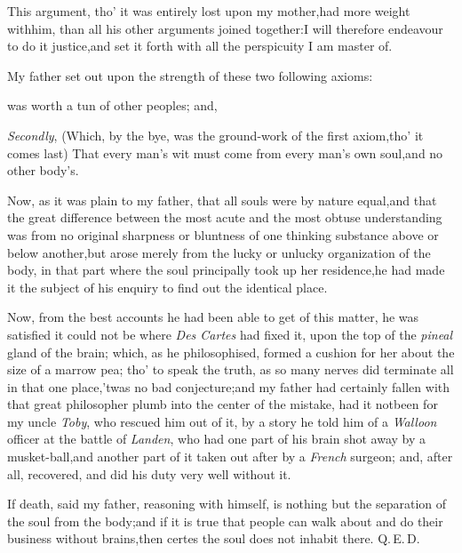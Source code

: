 \documentclass{article}
\begin{document}
This argument, tho’ it was entirely lost upon my
mother,\tsk had more weight with\pb him, than all his other
arguments joined together:\tsk I will therefore endeavour to do
it justice,\tsk and set it forth with all the perspicuity I am
master of.

My father set out upon the strength of these two following
axioms:

\noindent
{}
was worth a tun of other peoples; and,

\textit{Secondly}, (Which, by the bye, was the ground-work of the
first axiom,\tsk tho’ it comes last) That every
man’s wit must come from every man’s own
soul,\tsh and no other body’s.

Now, as it was plain to my father, that all souls were by nature
equal,\tsk and that the great difference between the most
acute and the most obtuse understanding\pb
\tsk was from no
original sharpness or bluntness of one thinking substance above or
below another,\tsk but arose merely from the lucky or
unlucky organization of the body, in that part where the soul
principally took up her residence,\tsh he had made it the
subject of his enquiry to find out the identical place.

Now, from the best accounts he had been able to get of this
matter, he was satisfied it could not be where \textit{Des
Cartes} had fixed it, upon the top of the \textit{pineal}
gland of the brain; which, as he philo\-sophised, formed a cushion
for her about the size of a marrow pea; tho’ to speak the
truth, as so many nerves did terminate all in that one
place,\tsk ’twas no bad conjecture;\tsk and my
father had certainly fallen with that great philosopher plumb into
the center of the mistake, had it not\pb been for my uncle
\textit{Toby}, who rescued him out of it, by a story he told him of a
\textit{Walloon} officer at the battle of \textit{Landen}, who had one
part of his brain shot away by a musket-ball,\tsk and another
part of it taken out after by a \textit{French} surgeon; and, after
all, recovered, and did his duty very well without it.

If death, said my father, reasoning with himself, is nothing but
the separation of the soul from the body;\tsk and if it is true
that people can walk about and do their business without
brains,\tsk then certes the soul does not inhabit there.
\quad Q.\,E.\,D.
\end{document}
